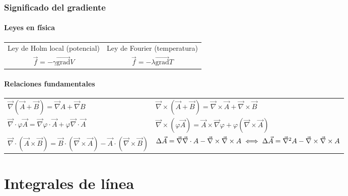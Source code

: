\documentclass{report}
\begin{document}
      \subsection*{Significado del gradiente}
        \subsubsection{Leyes en física}
          \setlength{\tabcolsep}{1.4cm}
          \hspace{-1.3cm}
          \begin{tabular}{l l}
            Ley de Holm local (potencial)      & Ley de Fourier (temperatura)\\
            \multicolumn{1}{c}{$\vec{f}=-\gamma\vec{\text{grad}}V$}& 
            \multicolumn{1}{c}{$\vec{f}=-\lambda\vec{\text{grad}}T$}
          \end{tabular}
        \subsubsection{Relaciones fundamentales}
          \setlength\extrarowheight{8pt}
          \setlength{\tabcolsep}{0.9cm}
          \hspace{-0.8cm}
          \begin{tabular}{ l  l }
            $\vec{\nabla}(\vec{A}+\vec{B})=\vec{\nabla}A+\vec{\nabla}B$&
            $\vec{\nabla}\times(\vec{A}+\vec{B})=\vec{\nabla}\times\vec{A}
              +\vec{\nabla}\times\vec{B}$\\ 
            $\vec{\nabla}\cdot\varphi\vec{A}=\vec{\nabla}\varphi\cdot\vec{A}+\varphi
              \vec{\nabla}\cdot\vec{A}$& 
            $\vec{\nabla}\times(\varphi\vec{A})=\vec{A}\times\vec{\nabla}\varphi+
              \varphi(\vec{\nabla}\times\vec{A})$\\ 
            $\vec{\nabla}\cdot(\vec{A}\times\vec{B})=\vec{B}\cdot(\vec{\nabla}\times
              \vec{A})-\vec{A}\cdot(\vec{\nabla}\times\vec{B})$&
            $\Delta\vec{A}=\vec{\nabla}\vec{\nabla}\cdot A -
              \vec{\nabla}\times\vec{\nabla}\times A\hspace{0.1cm}\Longleftrightarrow
              \hspace{0.1cm}\Delta\vec{A}=\vec{\nabla}^2A-\vec{\nabla}\times
              \vec{\nabla}\times A$
          \end{tabular}
\chapter{Integrales de línea}
\end{document}
